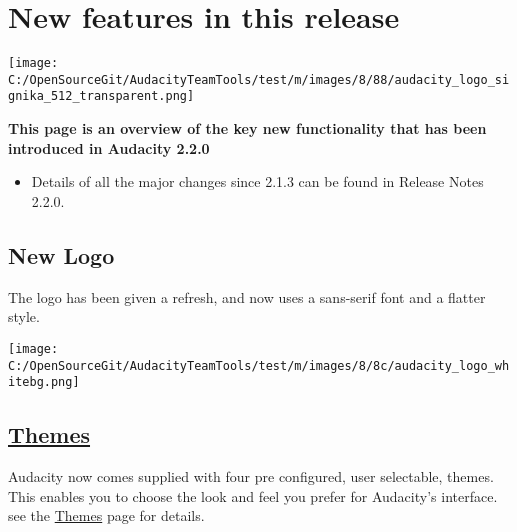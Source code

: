 \label{newXfeaturesXinXthisXreleaseX}
\chapter{New features in this release}\begin{multicols}{2}\par \texttt{[image: C:/OpenSourceGit/AudacityTeamTools/test/m/images/8/88/audacity\_logo\_signika\_512\_transparent.png]}\par \textbf{This page is an overview of the key new functionality that has been introduced in Audacity 2.2.0}
\begin{itemize}
\item Details of all the major changes since 2.1.3 can be found in Release Notes 2.2.0.
\end{itemize}

\label{newXfeaturesXinXthisXreleaseXlogo}
\section{New Logo}The logo has been given a refresh, and now uses a sans-serif font and a flatter style.
\par \texttt{[image: C:/OpenSourceGit/AudacityTeamTools/test/m/images/8/8c/audacity\_logo\_whitebg.png]}\par 
\label{newXfeaturesXinXthisXreleaseXthemes}
\section{
\hyperref[\foo{themesX}]{Themes}
}Audacity now comes supplied with four pre configured, user selectable, themes.  This enables you to choose the look and feel you prefer for Audacity's interface. see the 
\hyperref[\foo{themesX}]{Themes}
 page for details.


\end{multicols}

